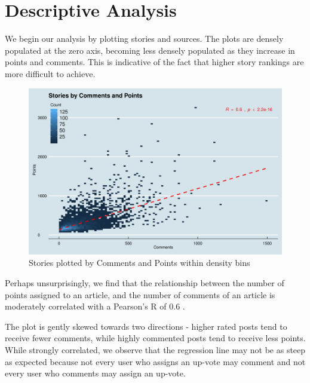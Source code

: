 \documentclass[11pt,journal,final,a4paper]{IEEEtran}
\begin{document}
\section{Descriptive Analysis}
We begin our analysis by plotting stories and sources. The plots are densely populated at the zero axis, becoming less densely populated as they increase in points and comments. This is indicative of the fact that higher story rankings are more difficult to achieve.

\begin{figure}[!ht]
\centerline{\includegraphics[scale=0.4]{img/descriptive_01_sources_bin.png}}
\caption{Stories plotted by Comments and Points within density bins}
\label{fig1}
\end{figure}

Perhaps unsurprisingly, we find that the relationship between the number of points assigned to an article, and the number of comments of an article is moderately correlated with a Pearson's R of 0.6 \cite{test:pearson}. 

The plot is gently skewed towards two directions - higher rated posts tend to receive fewer comments, while highly commented posts tend to receive less points. While strongly correlated, we observe that the regression line may not be as steep as expected because not every user who assigns an up-vote may comment and not every user who comments may assign an up-vote. 
\end{document}
